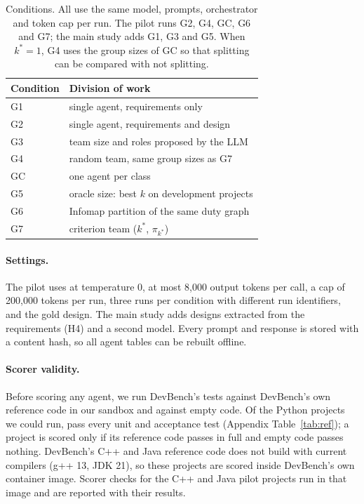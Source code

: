 \begin{table}[t]
\centering
\caption{Conditions. All use the same model, prompts, orchestrator and token cap per run. The pilot runs G2, G4, GC, G6 and G7; the main study adds G1, G3 and G5. When $k^\ast = 1$, G4 uses the group sizes of GC so that splitting can be compared with not splitting.}
\label{tab:conditions}
\small
\begin{tabular}{@{}ll@{}}
\toprule
Condition & Division of work \\
\midrule
G1 & single agent, requirements only \\
G2 & single agent, requirements and design \\
G3 & team size and roles proposed by the LLM \\
G4 & random team, same group sizes as G7 \\
GC & one agent per class \\
G5 & oracle size: best $k$ on development projects \\
G6 & Infomap partition of the same duty graph \\
G7 & criterion team ($k^\ast$, $\pi_{k^\ast}$) \\
\bottomrule
\end{tabular}
\end{table}

\paragraph{Settings.} The pilot uses \ModelSentence{} at temperature 0, at most 8{,}000 output tokens per call, a cap of 200{,}000 tokens per run, three runs per condition with different run identifiers, and the gold design. The main study adds designs extracted from the requirements (H4) and a second model. Every prompt and response is stored with a content hash, so all agent tables can be rebuilt offline. \RunHardware

\paragraph{Scorer validity.} Before scoring any agent, we run DevBench's tests against DevBench's own reference code in our sandbox and against empty code. Of the \NRefRan Python projects we could run, \NRefFull pass every unit and acceptance test (Appendix Table~\ref{tab:ref}); a project is scored only if its reference code passes in full and empty code passes nothing. DevBench's C++ and Java reference code does not build with current compilers (g++ 13, JDK 21), so these projects are scored inside DevBench's own container image. Scorer checks for the C++ and Java pilot projects run in that image and are reported with their results.

